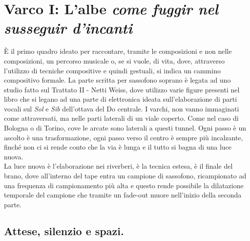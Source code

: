 
\section{Varco I: L'albe \textit{come fuggir nel susseguir d'incanti}}

È il primo quadro ideato per raccontare, tramite le composizioni e non nelle composizioni, un percorso musicale o, se si vuole, di vita, dove, attraverso l’utilizzo di tecniche compositive e quindi gestuali, si indica un cammino compositivo formale. La parte scritta per sassofono soprano è legata ad uno studio fatto sul Trattato II - Netti Weiss, dove utilizzo varie figure presenti nel libro che si legano ad una parte di elettronica ideata sull’elaborazione di parti vocali sul \textit{Sol} e \textit{Sib} dell'ottava del Do centrale.
I varchi, non vanno immaginati come attraversati, ma nelle parti laterali di un viale coperto. Come nel caso di Bologna o di Torino, cove le arcate sono laterali a questi tunnel. Ogni passo è un ascolto è una trasformazione, ogni passo verso il centro è sempre più incalzante, finché non ci si rende conto che la via è lunga e il tutto si bagna di una luce nuova. \\
La luce nuova è l'elaborazione nei riverberi, è la tecnica estesa, è il finale del brano, dove all'interno del tape entra un campione di sassofono, ricampionato ad una frequenza di campionamento più alta e questo rende possibile la dilatazione temporale del campione che tramite un fade-out muore nell'inizio della seconda parte.

\subsection{Attese, silenzio e spazi.}

